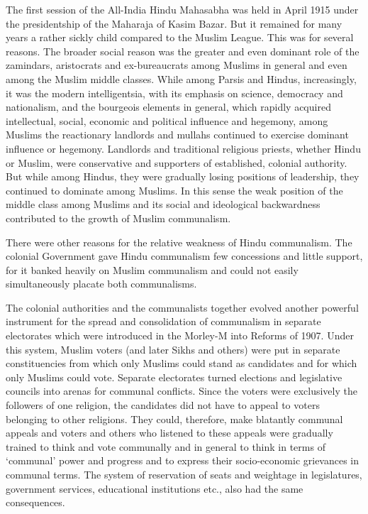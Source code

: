 The first session of the All-India Hindu Mahasabha was held in April 1915 under the presidentship of the Maharaja of Kasim Bazar. But it remained for many years a rather sickly child compared to the Muslim League. This was for several reasons. The broader social reason was the greater and even dominant role of the zamindars, aristocrats and ex-bureaucrats among Muslims in general and even among the Muslim middle classes. While among Parsis and Hindus, increasingly, it was the modern intelligentsia, with its emphasis on science, democracy and nationalism, and the bourgeois elements in general, which rapidly acquired intellectual, social, economic and political influence and hegemony, among Muslims the reactionary landlords and mullahs continued to exercise dominant influence or hegemony. Landlords and traditional religious priests, whether Hindu or Muslim, were conservative and supporters of established, colonial authority. But while among Hindus, they were gradually losing positions of leadership, they continued to dominate among Muslims. In this sense the weak position of the middle class among Muslims and its social and ideological backwardness contributed to the growth of Muslim communalism. 

There were other reasons for the relative weakness of Hindu communalism. The colonial Government gave Hindu communalism few concessions and little support, for it banked heavily on Muslim communalism and could not easily simultaneously placate both communalisms. 

The colonial authorities and the communalists together evolved another powerful instrument for the spread and consolidation of communalism in separate electorates which were introduced in the Morley-M into Reforms of 1907. Under this system, Muslim voters (and later Sikhs and others) were put in separate constituencies from which only Muslims could stand as candidates and for which only Muslims could vote. Separate electorates turned elections and legislative councils into arenas for communal conflicts. Since the voters were exclusively the followers of one religion, the candidates did not have to appeal to voters belonging to other religions. They could, therefore, make blatantly communal appeals and voters and others who listened to these appeals were gradually trained to think and vote communally and in general to think in terms of `communal' power and progress and to express their socio-economic grievances in communal terms. The system of reservation of seats and weightage in legislatures, government services, educational institutions etc., also had the same consequences. 

